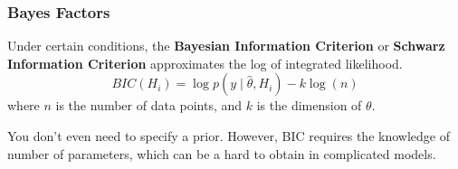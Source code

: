 \documentclass{beamer}
\begin{document}
\begin{frame}
\frametitle{Bayes Factors}

Under certain conditions, the {\bf Bayesian Information Criterion} or {\bf Schwarz Information Criterion} approximates the log of integrated likelihood. 
\[
BIC(H_i) = \log p(y \mid \hat{\theta}, H_i) - k \log(n)
\]
where $n$ is the number of data points, and $k$ is the dimension of $\theta$.
\newline

You don't even need to specify a prior. However, BIC requires the knowledge of number of parameters, which can be a hard to obtain in complicated models.

\end{frame}
\end{document}

